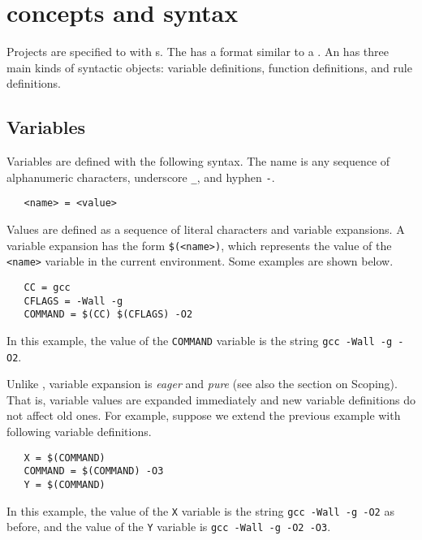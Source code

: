 %
\chapter{\OMake{} concepts and syntax}
\label{chapter:language}

Projects are specified to  with s.  The  has a format
similar to a .  An  has three main kinds of syntactic objects:
variable definitions, function definitions, and rule definitions.

\section{Variables}
\label{section:variables}

Variables are defined with the following syntax.  The name is any sequence of alphanumeric
characters, underscore \verb+_+, and hyphen \verb+-+.

\begin{verbatim}
   <name> = <value>
\end{verbatim}

Values are defined as a sequence of literal characters and variable expansions.  A variable
expansion has the form \verb+$(<name>)+, which represents the value of the \verb+<name>+
variable in the current environment.  Some examples are shown below.

\begin{verbatim}
   CC = gcc
   CFLAGS = -Wall -g
   COMMAND = $(CC) $(CFLAGS) -O2
\end{verbatim}

In this example, the value of the \verb+COMMAND+ variable is the string \verb+gcc -Wall -g -O2+.

Unlike , variable expansion is \emph{eager} and \emph{pure} (see also the section
on Scoping).  That is, variable values are expanded immediately and new variable definitions do not
affect old ones.  For example, suppose we extend the previous example with following variable
definitions.

\begin{verbatim}
   X = $(COMMAND)
   COMMAND = $(COMMAND) -O3
   Y = $(COMMAND)
\end{verbatim}

In this example, the value of the \verb+X+ variable is the string \verb+gcc -Wall -g -O2+ as
before, and the value of the \verb+Y+ variable is \verb+gcc -Wall -g -O2 -O3+.

